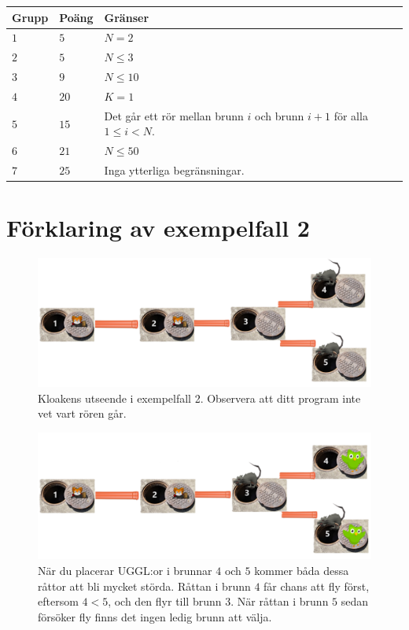 \noindent
\begin{tabular}{| l | l | l |}
  \hline
  \textbf{Grupp} & \textbf{Poäng} & \textbf{Gränser} \\ \hline
  $1$   & $5$        & $N = 2$ \\ \hline
  $2$   & $5$        & $N \leq 3$ \\ \hline
  $3$   & $9$        & $N \leq 10$ \\ \hline
  $4$   & $20$        & $K = 1$ \\ \hline
  $5$   & $15$        & Det går ett rör mellan brunn $i$ och brunn $i+1$ för alla $1 \leq i < N$. \\ \hline
  $6$   & $21$        & $N \leq 50$ \\ \hline
  $7$   & $25$        & Inga ytterliga begränsningar. \\ \hline
\end{tabular}


\section*{Förklaring av exempelfall 2}

\begin{centering}
  \begin{figure}[h]
    \centering
    \includegraphics[scale=0.2]{rats_graph before.png}
    \caption{Kloakens utseende i exempelfall 2. Observera att ditt program inte vet vart rören går.}
  \end{figure}
\end{centering}

\begin{centering}
  \begin{figure}[h]
    \centering
    \includegraphics[scale=0.2]{rats_graph step1.png}
    \caption{När du placerar UGGL:or i brunnar $4$ och $5$ kommer båda dessa råttor att bli mycket störda. Råttan i brunn $4$ får chans att fly först, eftersom $4 < 5$, och den flyr till brunn $3$. När råttan i brunn $5$ sedan försöker fly finns det ingen ledig brunn att välja.}
  \end{figure}
\end{centering}

